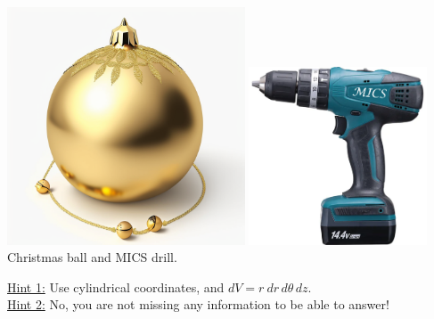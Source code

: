\documentclass[a4paper, top=10mm]{article}
\begin{document}
	\begin{center}
		\includegraphics[height=200pt]{01xmas_ball.png}
		\includegraphics[height=150pt]{01MICS_drill.png}\\
		Christmas ball and MICS drill.
	\end{center}
	
	\underline{Hint 1:} Use cylindrical coordinates, and $dV = r\ dr\, d\theta\, dz$.\\
	
	\underline{Hint 2:} No, you are not missing any information to be able to answer!
	
	
\end{document}
